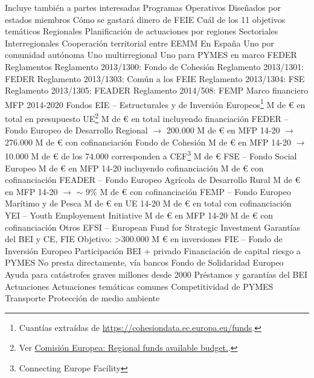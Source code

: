 \documentclass{nuevotema}
\begin{document}
\begin{esquemal}
				\4 Incluye también a partes interesadas
			\3 Programas Operativos
				\4 Diseñados por estados miembros
				\4 Cómo se gastará dinero de FEIE
				\4[] Cuál de los 11 objetivos temáticos
				\4 Regionales
				\4[] Planificación de actuaciones por regiones
				\4 Sectoriales
				\4 Interregionales
				\4[] Cooperación territorial entre EEMM
				\4 En España
				\4[] Uno por comunidad autónoma
				\4[] Uno multirregional
				\4[] Uno para PYMES en marco FEDER
			\3 Reglamentos
				\4 Reglamento 2013/1300: Fondo de Cohesión
				\4 Reglamento 2013/1301: FEDER
				\4 Reglamento 2013/1303: Común a los FEIE
				\4 Reglamento 2013/1304: FSE
				\4 Reglamento 2013/1305: FEADER
				\4 Reglamento 2014/508: FEMP
		\2 Marco financiero
			\3 MFP 2014-2020
			\3 Fondos EIE -- Estructurales y de Inversión Europeos\footnote{Cuantías extraídas de \url{https://cohesiondata.ec.europa.eu/funds}.}
				 M de € en total en presupuesto UE\footnote{Ver \href{https://cohesiondata.ec.europa.eu/overview}{Comisión Europea: Regional funds available budget.}.}
				 M de € en total incluyendo financiación
				\4 FEDER -- Fondo Europeo de Desarrollo Regional
				\4[] $\to$ 200.000 M de € en MFP 14-20
				\4[] $\to$ 276.000 M de € con cofinanciación
				\4 Fondo de Cohesión
				 M de € en MFP 14-20
				\4[] $\to$ 10.000 M de € de los 74.000 corresponden a CEF\footnote{Connecting Europe Facility}
				 M de €
				\4 FSE -- Fondo Social Europeo
				 M de € en MFP 14-20 incluyendo cofinanciación
				 M de € con cofinanciación
				\4 FEADER -- Fondo Europeo Agrícola de Desarrollo Rural
				 M de € en MFP 14-20
				\4[] $\to$ $\sim$ $9\%$
				 M de € con cofinanciación
				\4 FEMP -- Fondo Europeo Marítimo y de Pesca
				 M de € en UE 14-20
				 M de € en total con cofinanciación
				\4 YEI -- Youth Employement Initiative
				 M de € en MFP 14-20
				 M de € con cofinanciación
			\3 Otros
				\4 EFSI -- European Fund for Strategic Investment
				\4[] Garantías del BEI y CE, FIE
				\4[] Objetivo: >300.000 M € en inversiones
				\4 FIE -- Fondo de Inversión Europeo
				\4[] Participación BEI + privado
				\4[] Financiación de capital riesgo a PYMES
				\4[] No presta directamente, vía bancos
				\4 Fondo de Solidaridad Europeo
				\4[] Ayuda para catástrofes graves
				 millones desde 2000
				\4 Préstamos y garantías del BEI
		\2 Actuaciones
			\3 Actuaciones temáticas comunes
				\4 Competitividad de PYMES
				\4 Transporte
				\4 Protección de medio ambiente

\end{esquemal}
\end{document}
